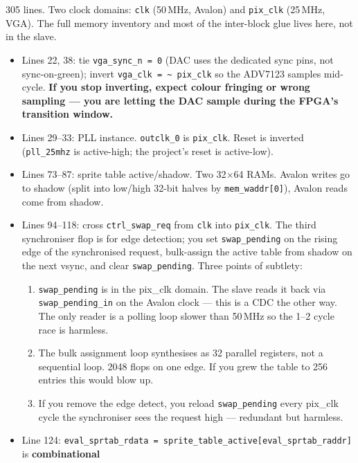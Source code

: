 \documentclass[11pt,letterpaper]{article}
\begin{document}
305 lines. Two clock domains: \texttt{clk} (50\,MHz, Avalon) and
\texttt{pix\_clk} (25\,MHz, VGA). The full memory inventory and most of the
inter-block glue lives here, not in the slave.

\begin{itemize}[leftmargin=*]
  \item Lines 22, 38: tie \texttt{vga\_sync\_n = 0} (DAC uses the dedicated
    sync pins, not sync-on-green); invert \texttt{vga\_clk = \textasciitilde
    pix\_clk} so the ADV7123 samples mid-cycle. \textbf{If you stop
    inverting, expect colour fringing or wrong sampling --- you are letting
    the DAC sample during the FPGA's transition window.}
  \item Lines 29--33: PLL instance. \texttt{outclk\_0} is \texttt{pix\_clk}.
    Reset is inverted (\texttt{pll\_25mhz} is active-high; the project's
    reset is active-low).
  \item Lines 73--87: sprite table active/shadow. Two 32$\times$64 RAMs.
    Avalon writes go to shadow (split into low/high 32-bit halves by
    \texttt{mem\_waddr[0]}), Avalon reads come from shadow.
  \item Lines 94--118: cross \texttt{ctrl\_swap\_req} from \texttt{clk} into
    \texttt{pix\_clk}. The third synchroniser flop is for edge detection;
    you set \texttt{swap\_pending} on the rising edge of the synchronised
    request, bulk-assign the active table from shadow on the next vsync,
    and clear \texttt{swap\_pending}. Three points of subtlety:
  \begin{enumerate}[leftmargin=*,nosep]
    \item \texttt{swap\_pending} is in the pix\_clk domain. The slave reads
      it back via \texttt{swap\_pending\_in} on the Avalon clock --- this is
      a CDC the other way. The only reader is a polling loop slower than
      50\,MHz so the 1--2 cycle race is harmless.
    \item The bulk assignment loop synthesises as 32 parallel registers,
      not a sequential loop. 2048 flops on one edge. If you grew the table
      to 256 entries this would blow up.
    \item If you remove the edge detect, you reload \texttt{swap\_pending}
      every pix\_clk cycle the synchroniser sees the request high ---
      redundant but harmless.
  \end{enumerate}
  \item Line 124: \texttt{eval\_sprtab\_rdata =
    sprite\_table\_active[eval\_sprtab\_raddr]} is \textbf{combinational}

\end{itemize}
\end{document}
